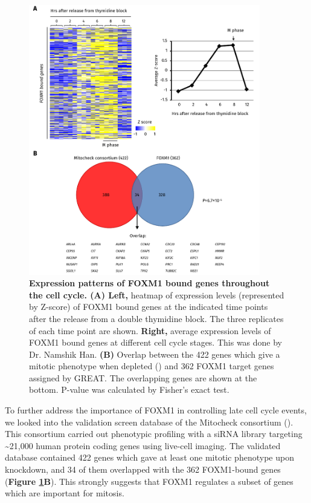\begin{figure}[!h]
    \centering
    \includegraphics[width=0.9\textwidth]{chapter3/figures_foxm1/fig20.pdf}
    \caption[Expression patterns of FOXM1 bound genes throughout the cell cycle]{\textbf{Expression patterns of FOXM1 bound genes throughout the cell cycle. (A) Left,} heatmap of expression levels (represented by Z-score) of FOXM1 bound genes at the indicated time points after the release from a double thymidine block. The three replicates of each time point are shown. \textbf{Right,} average expression levels of FOXM1 bound genes at different cell cycle stages. This was done by Dr. Namshik Han. \textbf{(B)} Overlap between the 422 genes which give a mitotic phenotype when depleted (\cite{neumann2010phenotypic}) and 362 FOXM1 target genes assigned by GREAT. The overlapping genes are shown at the bottom. P-value was calculated by Fisher's exact test.}
    \label{fig:fig20}
\end{figure}

To further address the importance of FOXM1 in controlling late cell cycle events, we looked into the validation screen database of the Mitocheck consortium (\cite{neumann2010phenotypic}). This consortium carried out phenotypic profiling with a siRNA library targeting \textasciitilde 21,000 human protein coding genes using live-cell imaging. The validated database contained 422 genes which gave at least one mitotic phenotype upon knockdown, and 34 of them overlapped with the 362 FOXM1-bound genes (\textbf{Figure \ref{fig:fig20}B}). This strongly suggests that FOXM1 regulates a subset of genes which are important for mitosis.

